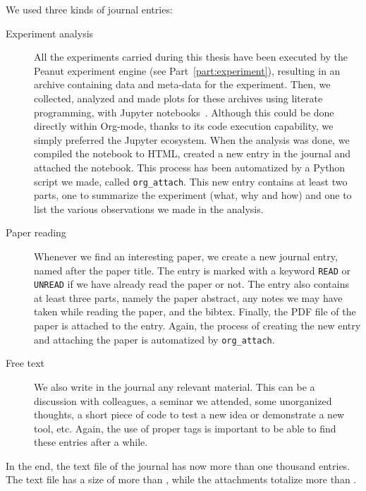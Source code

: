     We used three kinds of journal entries:
    \begin{description}
        \item[Experiment analysis] All the experiments carried during this thesis have been executed by the Peanut
            experiment engine (see Part~\ref{part:experiment}), resulting in an archive containing data and meta-data
            for the experiment. Then, we collected, analyzed and made plots for these archives using literate
            programming, with Jupyter notebooks~\cite{jupyter}. Although this could be done directly within Org-mode,
            thanks to its code execution capability, we simply preferred the Jupyter ecosystem. When the analysis was
            done, we compiled the notebook to HTML, created a new entry in the journal and attached the notebook. This
            process has been automatized by a Python script we made, called \texttt{org\_attach}. This new entry
            contains at least two parts, one to summarize the experiment (what, why and how) and one to list the various
            observations we made in the analysis.
        \item[Paper reading] Whenever we find an interesting paper, we create a new journal entry, named after the paper
            title. The entry is marked with a keyword \texttt{READ} or \texttt{UNREAD} if we have already read the
            paper or not. The entry also contains at least three parts, namely the paper abstract, any notes we may have
            taken while reading the paper, and the bibtex. Finally, the PDF file of the paper is attached to the entry.
            Again, the process of creating the new entry and attaching the paper is automatized by \texttt{org\_attach}.
        \item[Free text] We also write in the journal any relevant material. This can be a discussion with colleagues,
            a seminar we attended, some unorganized thoughts, a short piece of code to test a new idea or demonstrate a
            new tool, etc. Again, the use of proper tags is important to be able to find these entries after a while.
    \end{description}

    In the end, the text file of the journal has now more than one thousand entries. The text file has a size of more
    than , while the attachments totalize more than .

